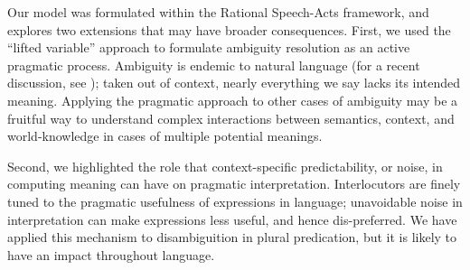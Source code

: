 \documentclass[linguex]{sp}
\begin{document}
Our model was formulated within the Rational Speech-Acts framework, and explores two extensions that may have broader consequences. First, we used the ``lifted variable'' approach to formulate ambiguity resolution as an active pragmatic process.
Ambiguity is endemic to natural language (for a recent discussion, see \citealp{piantadosietal2012}); taken out of context, nearly everything we say lacks its intended meaning. Applying the pragmatic approach to other cases of ambiguity may be a fruitful way to understand complex interactions between semantics, context, and world-knowledge in cases of multiple potential meanings.

Second, we highlighted the role that context-specific predictability, or noise, in computing meaning can have on pragmatic interpretation. Interlocutors are finely tuned to the pragmatic usefulness of expressions in language; unavoidable noise in interpretation can make expressions less useful, and hence dis-preferred. We have applied this mechanism to disambiguition in plural predication, but it is likely to have an impact throughout language.



%
\end{document}
